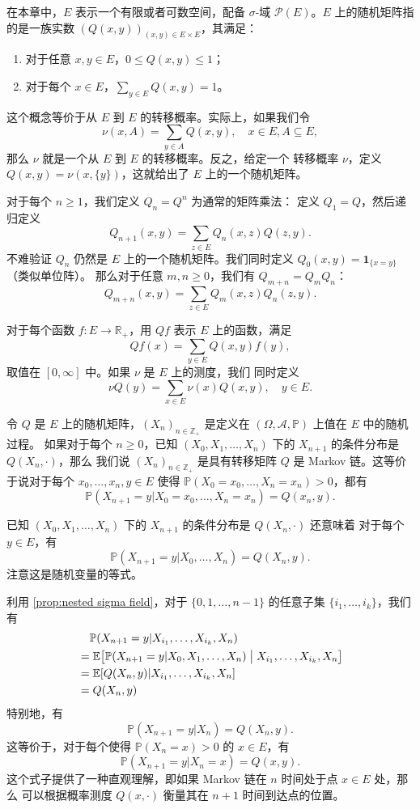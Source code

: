 \documentclass[fontset=none]{Notes}
\newcommand{\indicator}[1]{\mathbold 1_{#1}}
\begin{document}
在本章中，$E$ 表示一个有限或者可数空间，配备 $\sigma$-域
$\mathcal{P}(E)$。$E$ 上的随机矩阵指的是一族实数 
$(Q(x,y))_{(x,y)\in E\times E}$，其满足：
\begin{enumerate}
  \item 对于任意 $x,y\in E$，$0\leq Q(x,y)\leq 1$；
  \item 对于每个 $x\in E$，$\sum_{y\in E}Q(x,y)=1$。
\end{enumerate}

这个概念等价于从 $E$ 到 $E$ 的转移概率。实际上，如果我们令
\[
  \nu(x,A)=\sum_{y\in A}Q(x,y),\quad x\in E,A\subseteq E,  
\]
那么 $\nu$ 就是一个从 $E$ 到 $E$ 的转移概率。反之，给定一个
转移概率 $\nu$，定义 $Q(x,y)=\nu(x,\{y\})$，这就给出了 
$E$ 上的一个随机矩阵。

对于每个 $n\geq 1$，我们定义 $Q_n=Q^n$ 为通常的矩阵乘法：
定义 $Q_1=Q$，然后递归定义
\[
  Q_{n+1}(x,y)=\sum_{z\in E}Q_n(x,z)Q(z,y).  
\]
不难验证 $Q_n$ 仍然是 $E$ 上的一个随机矩阵。我们同时定义
$Q_0(x,y)=\indicator{\{x=y\}}$（类似单位阵）。
那么对于任意 $m,n\geq 0$，我们有 $Q_{m+n}=Q_mQ_n$：
\[
  Q_{m+n}(x,y)=\sum_{z\in E}Q_m(x,z)Q_n(z,y).  
\]

对于每个函数 $f:E\to \mathbb{R}_+$，用 $Qf$ 表示 $E$
上的函数，满足
\[
  Qf(x)=\sum_{y\in E}Q(x,y)f(y),  
\]
取值在 $[0,\infty]$ 中。如果 $\nu$ 是 $E$ 上的测度，我们
同时定义
\[
  \nu Q(y)=\sum_{x\in E}\nu(x)Q(x,y),\quad y\in E.  
\]

\begin{definition}
  令 $Q$ 是 $E$ 上的随机矩阵，$(X_n)_{n\in \mathbb{Z}_+}$
  是定义在 $(\Omega,\mathcal{A},\mathbb{P})$ 上值在 $E$ 中的随机过程。
  如果对于每个 $n\geq 0$，已知 $(X_0,X_1,\dots,X_n)$ 下的
  $X_{n+1}$ 的条件分布是 $Q(X_n,\cdot)$，那么 
  我们说 $(X_n)_{n\in \mathbb{Z}_+}$ 是具有转移矩阵 $Q$
  是 Markov 链。这等价于说对于每个 $x_0,\dots,x_n,y\in E$
  使得 $\mathbb{P}(X_0=x_0,\dots,X_n=x_n)>0$，都有
  \[
    \mathbb{P}(X_{n+1}=y|X_0=x_0,\dots,X_n=x_n)=Q(x_n,y).  
  \]
\end{definition}

已知 $(X_0,X_1,\dots,X_n)$ 下的 $X_{n+1}$ 的条件分布是 $Q(X_n,\cdot)$ 还意味着
对于每个 $y\in E$，有
\[
  \mathbb{P}(X_{n+1}=y|X_0,\dots,X_n)=Q(X_n,y).
\]
注意这是随机变量的等式。

利用 \autoref{prop:nested sigma field}，对于 $\{0,1,\dots,n-1\}$ 的任意子集
$\{i_1,\dots,i_k\}$，我们有
\begin{align*}
  &\hphantom{={}}\mathbb{P}(X_{n+1}=y|X_{i_1},\dots,X_{i_k},X_n)\\
  &=\mathbb{E}\bigl[\mathbb{P}(X_{n+1}=y|X_{0},X_1,\dots,X_n)\bigm| X_{i_1},\dots,X_{i_k},X_n\bigr]\\
  &=\mathbb{E}[Q(X_{n},y)|X_{i_1},\dots,X_{i_k},X_n]\\
  &=Q(X_n,y)
\end{align*}
特别地，有
\[
  \mathbb{P}(X_{n+1}=y|X_n)=Q(X_n,y).
\]
这等价于，对于每个使得 $\mathbb{P}(X_n=x)>0$ 的 $x\in E$，有
\[
  \mathbb{P}(X_{n+1}=y|X_n=x)=Q(x,y).
\]
这个式子提供了一种直观理解，即如果 Markov 链在 $n$ 时间处于点 $x\in E$ 处，那么
可以根据概率测度 $Q(x,\cdot)$ 衡量其在 $n+1$ 时间到达点的位置。
\end{document}
